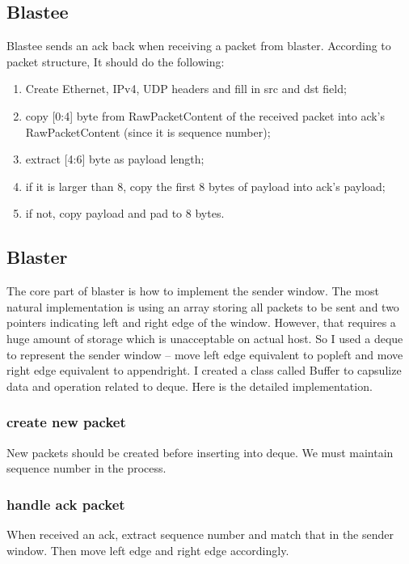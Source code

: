 \documentclass[12pt,a4paper,UTF8]{article}
\begin{document}
\subsection{Blastee}
Blastee sends an ack back when receiving a packet from blaster. According to packet structure, It should do the following:
\begin{enumerate}
	\item Create Ethernet, IPv4, UDP headers and fill in src and dst field;
	\item copy [0:4] byte from RawPacketContent of the received packet into ack's RawPacketContent (since it is sequence number);
	\item extract [4:6] byte as payload length;
	\item if it is larger than 8, copy the first 8 bytes of payload into ack's payload;
	\item if not, copy payload and pad to 8 bytes.
\end{enumerate}


\subsection{Blaster}
The core part of blaster is how to implement the sender window. The most natural implementation is using an array storing all packets to be sent and two pointers indicating left and right edge of the window. However, that requires a huge amount of storage which is unacceptable on actual host. So I used a deque to represent the sender window -- move left edge equivalent to popleft and move right edge equivalent to appendright.
I created a class called Buffer to capsulize data and operation related to deque.
Here is the detailed implementation.

\subsubsection{create new packet}
New packets should be created before inserting into deque. We must maintain sequence number in the process.


\subsubsection{handle ack packet}
When received an ack, extract sequence number and match that in the sender window. Then move left edge and right edge accordingly.

\end{document}
